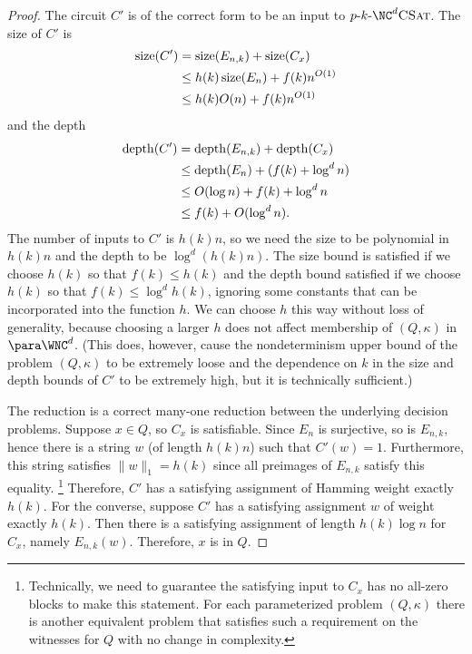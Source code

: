 \begin{proof}
  The circuit $C'$ is of the correct form to be an input to $\pNCSAT$.
  The size of $C'$ is
  \begin{align*}
    \operatorname{size}(C') & = \operatorname{size}(E_{n, k}) + \operatorname{size}(C_x) \\
    & \leq h(k) \operatorname{size}(E_n) + f(k) n^{O(1)} \\
    & \leq h(k) O(n) + f(k) n^{O(1)}
  \end{align*}
  and the depth
  \begin{align*}
    \operatorname{depth}(C') & = \operatorname{depth}(E_{n, k}) + \operatorname{depth}(C_x) \\
    & \leq \operatorname{depth}(E_n) + (f(k) + \log^d n) \\
    & \leq O(\log n) + f(k) + \log^d n \\
    & \leq f(k) + O(\log^d n).
  \end{align*}
  The number of inputs to $C'$ is $h(k) n$, so we need the size to be polynomial in $h(k) n$ and the depth to be $\log^d (h(k) n)$.
  The size bound is satisfied if we choose $h(k)$ so that $f(k) \leq h(k)$ and the depth bound satisfied if we choose $h(k)$ so that $f(k) \leq \log^d h(k)$, ignoring some constants that can be incorporated into the function $h$.
  We can choose $h$ this way without loss of generality, because choosing a larger $h$ does not affect membership of $(Q, \kappa)$ in $\para \WNC^d$.
  (This does, however, cause the nondeterminism upper bound of the problem $(Q, \kappa)$ to be extremely loose and the dependence on $k$ in the size and depth bounds of $C'$ to be extremely high, but it is technically sufficient.)

  The reduction is a correct many-one reduction between the underlying decision problems.
  Suppose $x \in Q$, so $C_x$ is satisfiable.
  Since $E_n$ is surjective, so is $E_{n, k}$, hence there is a string $w$ (of length $h(k) n$) such that $C'(w) = 1$.
  Furthermore, this string satisfies $\|w\|_1 = h(k)$ since all preimages of $E_{n, k}$ satisfy this equality.%
  \footnote{%
    Technically, we need to guarantee the satisfying input to $C_x$ has no all-zero blocks to make this statement.
    For each parameterized problem $(Q, \kappa)$ there is another equivalent problem that satisfies such a requirement on the witnesses for $Q$ with no change in complexity.%
  }
  Therefore, $C'$ has a satisfying assignment of Hamming weight exactly $h(k)$.
  For the converse, suppose $C'$ has a satisfying assignment $w$ of weight exactly $h(k)$.
  Then there is a satisfying assignment of length $h(k) \log n$ for $C_x$, namely $E_{n, k}(w)$.
  Therefore, $x$ is in $Q$.


\end{proof}
